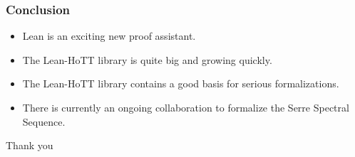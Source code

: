 \documentclass[xcolor=table]{beamer}
\begin{document}

\begin{frame}[fragile]
\frametitle{Conclusion}
\begin{itemize}
  \item Lean is an exciting new proof assistant.
  \item The Lean-HoTT library is quite big and growing quickly.
  \item The Lean-HoTT library contains a good basis for serious formalizations.
  \item There is currently an ongoing collaboration to formalize the Serre Spectral Sequence.
\end{itemize}
\end{frame}


\begin{frame}
  \begin{center}
   {\huge Thank you}
  \end{center}
\end{frame}

\end{document}
